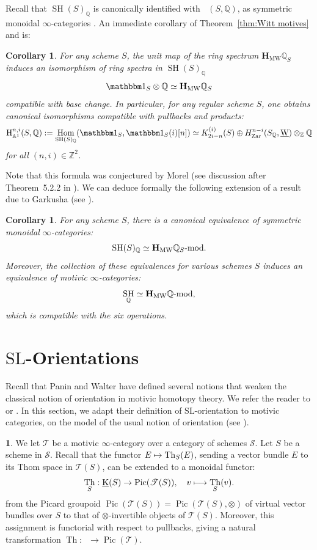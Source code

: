 \documentclass[JEP,XML,SOM,Unicode]{cedram}
\def\mto{\mathchoice{\longmapsto}{\mapsto}{\mapsto}{\mapsto}}
\newcommand{\modl}[1]{#1\textnormal{-}\mathrm{mod}}
\newcommand{\base}{\mathscr S}
\newcommand{\T}{\mathscr T}
\DeclareMathOperator{\uK}{\underline K}
\renewcommand{\AA}{\mathbb A}
\newcommand{\un}{\mathbbm 1}
\newcommand{\uW}{\underline{\mathrm W}}
\newcommand{\HMW}{\mathbf H_{\mathrm{MW}}}
\newcommand{\HA}{\mathrm H_{\AA^1}}
\newcommand{\SL}{\mathrm{SL}}
\DeclareMathOperator{\SH}{SH}
\DeclareMathOperator{\DA}{D_{\AA^1}}
\DeclareMathOperator{\Hom}{Hom}
\DeclareMathOperator{\Pic}{Pic}
\DeclareMathOperator{\Th}{Th}
\newcommand{\ZZ} {\mathbb Z}
\newcommand{\QQ} {\mathbb Q}
\newcommand{\zar}{\mathrm{Zar}}
\newtheorem{cor}[thm]{Corollary}
\theoremstyle{remark}
\theoremstyle{definition}
\newtheorem{num}[thm]{}
\numberwithin{equation}{thm}
\begin{document}
Recall that $\SH(S)_\QQ$ is canonically identified with $\DA(S,\QQ)$, as symmetric monoidal $\infty$-categories \cite[5.3.35]{CD3}.
An immediate corollary of Theorem~\ref{thm:Witt motives} and \cite[14.2.14]{CD3} is:
\begin{cor}\label{cor:rational_sphere&MW}
For any scheme $S$, the unit map of the ring spectrum $\HMW \QQ_S$ induces an isomorphism of ring spectra in $\SH(S)_\QQ$
\[
\un_S \otimes \QQ \simeq \HMW \QQ_S
\]
compatible with base change.
In particular, for any regular scheme $S$, one obtains canonical isomorphisms
compatible with pullbacks and products:
\[
\HA^{n,i}(S,\QQ):=\Hom_{\SH(S)_\QQ}(\un_S,\un_S(i)[n])
\simeq K_{2i-n}^{(i)}(S) \oplus H^{n-i}_\zar(S_\QQ,\uW) \otimes_\ZZ \QQ
\]
for all $(n,i)\in\ZZ^2$.
\end{cor}
Note that this formula was conjectured by Morel (see discussion after Theorem~5.2.2 in \cite{Morelpi0}).
We can deduce formally the following extension of a result due to Garkusha
(see \cite{Garkusha}).
\begin{cor}\label{cor:rational_SH&DMW}
For any scheme $S$, there is a canonical equivalence of symmetric monoidal $\infty$-categories:
\[
\SH(S)_\QQ \simeq \modl{\HMW \QQ_S}.
\]
Moreover, the collection of these equivalences for various schemes $S$
induces an equivalence of motivic $\infty$-categories:
\[
\SH_\QQ \simeq \modl{\HMW \QQ},
\]
which is compatible with the six operations.
\end{cor}

\section{\texorpdfstring{$\SL$}{SL}-Orientations}
\label{sec:SL}

Recall that Panin and Walter have defined several notions that weaken the classical notion of orientation in motivic homotopy theory. We refer the reader to \cite{AnaSL} or \cite[Def.\,2.1.3]{DF3}.
In this section, we adapt their definition of $\SL$-orientation to motivic categories, on the model of the usual notion of orientation (see \cite[2.4.38, 2.4.40]{CD3}).

\begin{num}
We let $\T$ be a motivic $\infty$-category over a category of schemes $\base$.
Let $S$ be a scheme in $\base$. Recall that the functor $E \mto \Th_S(E)$, sending a vector bundle $E$ to its Thom space in $\T(S)$, can be extended to a monoidal functor:
\[
\Th_S:\uK(S) \to \Pic(\T(S)),
\quad
v \mto \Th_S(v).
\]
from the Picard groupoid $\Pic(\T(S)) = \Pic(\T(S),\otimes)$ of virtual vector bundles over $S$ \cite{Del}
to that of $\otimes$-invertible objects of $\T(S)$.
Moreover, this assignment is functorial with respect to pullbacks,
giving a natural transformation $\Th:\uK \to \Pic(\T)$.
\end{num}
\end{document}
